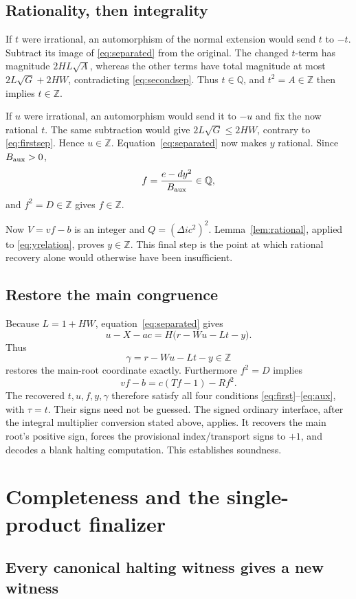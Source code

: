 \documentclass[11pt]{article}
\theoremstyle{remark}\newtheorem{remark}[theorem]{Remark}
\newcommand{\Z}{\mathbb Z}
\newcommand{\Q}{\mathbb Q}
\begin{document}
\subsection{Rationality, then integrality}

If \(t\) were irrational, an automorphism of the normal extension
would send \(t\) to \(-t\). Subtract its image of
\eqref{eq:separated} from the original. The changed \(t\)-term has
magnitude \(2HL\sqrt A\), whereas the other terms have total
magnitude at most \(2L\sqrt G+2HW\), contradicting
\eqref{eq:secondsep}. Thus \(t\in\Q\), and \(t^2=A\in\Z\)
then implies \(t\in\Z\).

If \(u\) were irrational, an automorphism would send it to \(-u\)
and fix the now rational \(t\). The same subtraction would give
\(2L\sqrt G\le2HW\), contrary to \eqref{eq:firstsep}.
Hence \(u\in\Z\). Equation~\eqref{eq:separated} now makes
\(y\) rational. Since \(B_{\rm aux}>0\),
\[
 f=\frac{e-dy^2}{B_{\rm aux}}\in\Q,
\]
and \(f^2=D\in\Z\) gives \(f\in\Z\).

Now \(V=vf-b\) is an integer and
\(Q=(\Delta ic^2)^2\). Lemma~\ref{lem:rational}, applied to
\eqref{eq:yrelation}, proves \(y\in\Z\).
This final step is the point at which rational recovery alone would
otherwise have been insufficient.

\subsection{Restore the main congruence}

Because \(L=1+HW\), equation~\eqref{eq:separated} gives
\[
 u-X-ac=H\bigl(r-Wu-Lt-y\bigr).
\]
Thus
\[
 \gamma=r-Wu-Lt-y\in\Z
\]
restores the main-root coordinate exactly.
Furthermore \(f^2=D\) implies
\[
 vf-b=c(Tf-1)-Rf^2.
\]
The recovered \(t,u,f,y,\gamma\) therefore satisfy all four
conditions \eqref{eq:first}--\eqref{eq:aux}, with \(\tau=t\).
Their signs need not be guessed. The signed ordinary interface,
after the integral multiplier conversion stated above, applies.
It recovers the main root's positive sign, forces the provisional
index/transport signs to \(+1\), and decodes a blank halting computation.
This establishes soundness.

\section{Completeness and the single-product finalizer}

\subsection{Every canonical halting witness gives a new witness}
\end{document}
